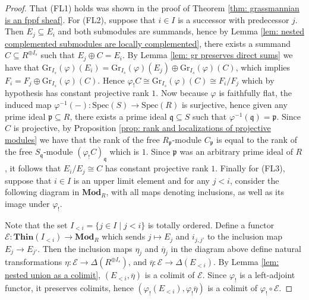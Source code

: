 \documentclass[oneside,11pt]{amsart}
\newcommand{\bMod}{\ensuremath{\textbf{Mod}}}
\newcommand{\bThin}{\ensuremath{\textbf{Thin}}}
\newcommand{\mE}{\ensuremath{\mathcal{E}}}
\newcommand{\fp}{\ensuremath{\mathfrak{p}}}
\newcommand{\fq}{\ensuremath{\mathfrak{q}}}
\newcommand{\Gr}{\ensuremath{\text{Gr}}}
\newcommand{\Spec}{\ensuremath{\text{Spec}}}
\theoremstyle{definition}
\newtheorem{proof techniques}{Proof Techniques}
\begin{document}
\begin{proof}
That (FL1) holds was shown in the proof of Theorem \ref{thm: grassmannian is an fppf sheaf}. For (FL2), suppose that $i \in I$ is a successor with predecessor $j$. Then $E_j \subseteq E_i$ and both submodules are summands, hence by Lemma \ref{lem: nested complemented submodules are locally complemented}, there exists a summand $C \subseteq R^{\oplus I_s}$ such that $E_j \oplus C= E_i$. By Lemma \ref{lem: gr preserves direct sums} we have that $\Gr_{I_s}(\varphi)(E_i) = \Gr_{I_s}(\varphi)(E_j) \oplus \Gr_{I_s}(\varphi)(C)$, which implies $F_i = F_j \oplus \Gr_{I_s}(\varphi)(C)$. Hence $\varphi_! C \cong \Gr_{I_s}(\varphi)(C) \cong F_i / F_j$ which by hypothesis has constant projective rank $1$. Now because $\varphi$ is faithfully flat, the induced map $\varphi^{-1}(-) : \Spec(S) \to \Spec(R)$ is surjective, hence given any prime ideal $\fp \subseteq R$, there exists a prime ideal $\fq \subseteq S$ such that $\varphi^{-1}(\fq) = \fp$. Since $C$ is projective, by Proposition \ref{prop: rank and localizations of projective modules} we have that the rank of the free $R_\fp$-module $C_\fp$ is equal to the rank of the free $S_\fq$-module $(\varphi_! C)_\fq$ which is $1$. Since $\fp$ was an arbitrary prime ideal of $R$, it follows that $E_i / E_j \cong C$ has constant projective rank $1$. Finally for (FL3), suppose that $i \in I$ is an upper limit element and for any $j < i$, consider the following diagram in $\bMod_R$, with all maps denoting inclusions, as well as its image under $\varphi_!$. 

\begin{center}
\end{center}

Note that the set $I_{<i} = \{ j \in I \mid j < i \}$ is totally ordered. Define a functor $\mE : \bThin(I_{<i}) \to \bMod_R$ which sends $j \mapsto E_j$ and $i_{j ,j'}$ to the inclusion map $E_j \to E_{j'}$. Then the inclusion maps $\eta_j$ and $\overline{\eta}_j$ in the diagram above define natural transformations $\eta : \mE \to \Delta(R^{\oplus I_s})$, and $\overline{\eta} : \mE \to \Delta(E_{<i})$. By Lemma \ref{lem: nested union as a colimit}, $(E_{<i} , \overline{\eta})$ is a colimit of $\mE$. Since $\varphi_!$ is a left-adjoint functor, it preserves colimits, hence $(\varphi_! (E_{<i}) , \varphi_! \overline{\eta})$ is a colimit of $\varphi_! \circ \mE$. 


\end{proof}
\end{document}
